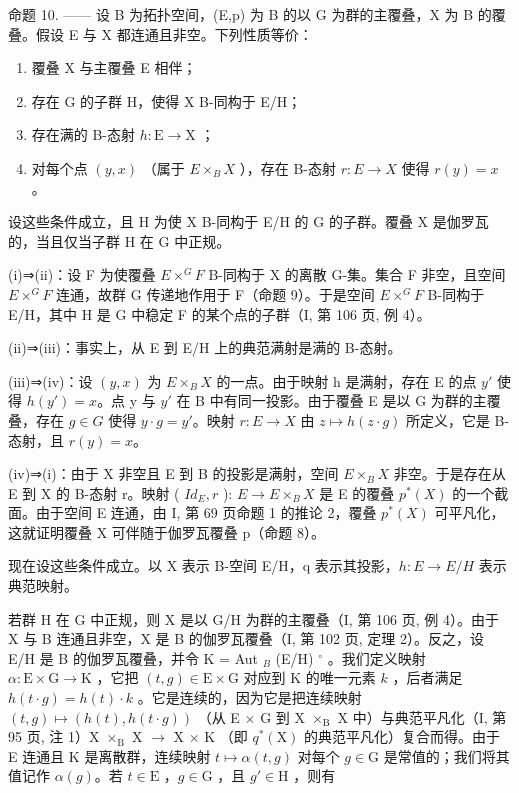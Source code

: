 命题 10. —— 设 B 为拓扑空间，(E,p) 为 B 的以 G 为群的主覆叠，X 为 B 的覆叠。假设 E 与 X 都连通且非空。下列性质等价：

\begin{enumerate}
\def\labelenumi{(\roman{enumi})}
\item
  覆叠 X 与主覆叠 E 相伴；
\item
  存在 G 的子群 H，使得 X B-同构于 E/H；
\item
  存在满的 B-态射 \(h: \mathrm{E} \to \mathrm{X}\) ；
\item
  对每个点 \((y, x)\) （属于 \(E \times_{B} X\) ），存在 B-态射 \(r: E \to X\) 使得 \(r(y) = x\) 。
\end{enumerate}

设这些条件成立，且 H 为使 X B-同构于 E/H 的 G 的子群。覆叠 X 是伽罗瓦的，当且仅当子群 H 在 G 中正规。

(i)⇒(ii)：设 F 为使覆叠 \(E \times^{G} F\) B-同构于 X 的离散 G-集。集合 F 非空，且空间 \(E \times^{G} F\) 连通，故群 G 传递地作用于 F（命题 9）。于是空间 \(E \times^{G} F\) B-同构于 E/H，其中 H 是 G 中稳定 F 的某个点的子群（I, 第 106 页, 例 4）。

(ii)⇒(iii)：事实上，从 E 到 E/H 上的典范满射是满的 B-态射。

(iii)⇒(iv)：设 \((y, x)\) 为 \(E \times_{B} X\) 的一点。由于映射 h 是满射，存在 E 的点 \(y'\) 使得 \(h(y') = x\)。点 y 与 \(y'\) 在 B 中有同一投影。由于覆叠 E 是以 G 为群的主覆叠，存在 \(g \in G\) 使得 \(y \cdot g = y'\)。映射 \(r: E \to X\) 由 \(z \mapsto h(z \cdot g)\) 所定义，它是 B-态射，且 \(r(y) = x\)。

(iv)⇒(i)：由于 X 非空且 E 到 B 的投影是满射，空间 \(E \times_{B} X\) 非空。于是存在从 E 到 X 的 B-态射 r。映射 ( \(Id_{E}, r\) ): \(E \to E \times_{B} X\) 是 E 的覆叠 \(p^{*}(X)\) 的一个截面。由于空间 E 连通，由 I, 第 69 页命题 1 的推论 2，覆叠 \(p^{*}(X)\) 可平凡化，这就证明覆叠 X 可伴随于伽罗瓦覆叠 p（命题 8）。

现在设这些条件成立。以 X 表示 B-空间 E/H，q 表示其投影，\(h: E \rightarrow E/H\) 表示典范映射。

若群 H 在 G 中正规，则 X 是以 G/H 为群的主覆叠（I, 第 106 页, 例 4）。由于 X 与 B 连通且非空，X 是 B 的伽罗瓦覆叠（I, 第 102 页, 定理 2）。反之，设 E/H 是 B 的伽罗瓦覆叠，并令 K = Aut \(_{B}\) (E/H) \(^{\circ}\) 。我们定义映射 \(\alpha: \mathrm{E} \times \mathrm{G} \to \mathrm{K}\) ，它把 \((t, g) \in \mathrm{E} \times \mathrm{G}\) 对应到 K 的唯一元素 \(k\) ，后者满足 \(h(t \cdot g) = h(t) \cdot k\) 。它是连续的，因为它是把连续映射 \((t, g) \mapsto (h(t), h(t \cdot g))\) （从 E \(\times\) G 到 X \(\times_{\mathrm{B}}\) X 中）与典范平凡化（I, 第 95 页, 注 1）X \(\times_{\mathrm{B}}\) X \(\to\) X \(\times\) K （即 \(q^{*}(\mathrm{X})\) 的典范平凡化）复合而得。由于 E 连通且 K 是离散群，连续映射 \(t \mapsto \alpha(t, g)\) 对每个 \(g \in \mathrm{G}\) 是常值的；我们将其值记作 \(\alpha(g)\)。若 \(t \in \mathrm{E}\) ，\(g \in \mathrm{G}\) ，且 \(g' \in \mathrm{H}\) ，则有

